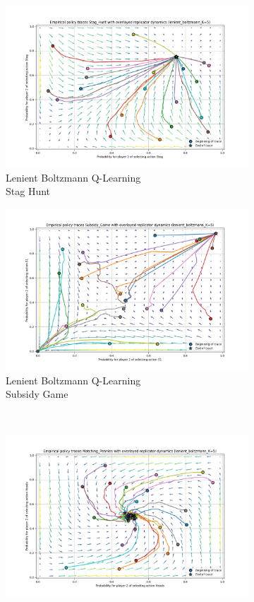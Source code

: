 \documentclass[12pt,letterpaper, onecolumn]{exam}
\begin{document}
\begin{figure}
    \begin{subfigure}{.5\textwidth}
      \centering
      \includegraphics[width=.6\linewidth]{plots/replicator_trajectoreis_Stag_Hunt_lenient_boltzmann_K=5.png}
      \caption{Lenient Boltzmann Q-Learning\\ Stag Hunt}
      \label{fig:sfiglbsh}
    \end{subfigure}%
    \begin{subfigure}{.5\textwidth}
      \centering
      \includegraphics[width=.6\linewidth]{plots/replicator_trajectoreis_Subsidy_Game_lenient_boltzmann_K=5.png}
      \caption{Lenient Boltzmann Q-Learning\\ Subsidy Game}
      \label{fig:sfiglbsg}
    \end{subfigure}\\
    \begin{subfigure}{.5\textwidth}
      \centering
      \includegraphics[width=.6\linewidth]{plots/replicator_trajectoreis_Matching_Pennies_lenient_boltzmann_K=5.png}

\end{subfigure}
\end{figure}
\end{document}
